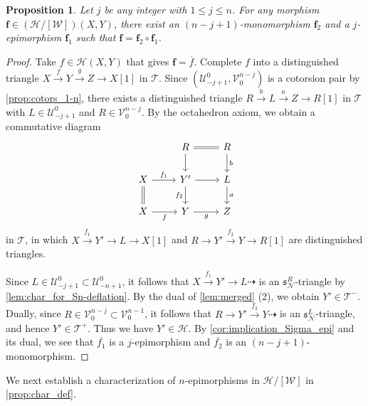 \documentclass[a4paper,reqno,10pt]{amsart}
\DeclareRobustCommand{\darkblueedit}[1]{#1}
\newtheorem{proposition}[proposition]{Proposition}
\theoremstyle{definition}
\theoremstyle{definition}
\theoremstyle{definition}
\theoremstyle{definition}
\theoremstyle{plain}
\newcommand{\fs}{\mathfrak{s}}
\newcommand{\CH}{\mathcal{H}}
\newcommand{\CN}{\mathcal{N}}
\newcommand{\CT}{\mathcal{T}}
\newcommand{\CU}{\mathcal{U}}
\newcommand{\CV}{\mathcal{V}}
\newcommand{\CW}{\mathcal{W}}
\begin{document}
\begin{proposition}\label{prop:factorization}
Let $j$ be any integer with $1\le j\le n$.
For any morphism $\mathbf{f}\in(\CH/[\CW])(X,Y)$, there exist an \darkblueedit{$(n-j+1)$-monomorphism} $\mathbf{f}_2$ and a $j$-epimorphism $\mathbf{f}_1$ such that $\mathbf{f}=\mathbf{f}_2\circ \mathbf{f}_1$.
\end{proposition}
\begin{proof}
Take $f\in\CH(X,Y)$ that gives $\mathbf{f}=\overline{f}$.
Complete $f$ into a distinguished triangle $X\xrightarrow{f}Y\xrightarrow{g}Z\to X[1]$ in $\CT$.
Since $(\CU_{-j+1}^0,\CV_0^{n-j})$ is a cotorsion pair by \cref{prop:cotors_1-n}, there exists a distinguished triangle
$R\xrightarrow{b}L\xrightarrow{a}Z\to R[1]$
in $\CT$ with $L\in\CU_{-j+1}^0$ and $R\in\CV_0^{n-j}$.
By the octahedron axiom, we obtain a commutative diagram
\[
\begin{tikzcd}
{} & R\arrow{d}\arrow[equal]{r} & R\arrow{d}{b} 
\\
X\arrow{r}{f_1}\arrow[equal]{d} & Y'\arrow{d}[swap]{f_2}\arrow{r} & L\arrow{d}{a}
\\
X\arrow{r}[swap]{f} & Y\arrow{r}[swap]{g} & Z %
\end{tikzcd}
\]
in $\CT$, in which $X\xrightarrow{f_1}Y'\to L\to X[1]$ and $R\to Y'\xrightarrow{f_2}Y\to R[1]$ are distinguished triangles.

Since $L\in\CU_{-j+1}^0\subset\CU_{-n+1}^0$, it follows that 
$X\xrightarrow{f_1}Y'\to L\dashrightarrow$ is an $\fs^R_{\CN}$-triangle by \cref{lem:char_for_Sn-deflation}.
By the dual of \cref{lem:merged} {\rm (2)}, we obtain $Y'\in\CT^-$. 
Dually, since $R\in\CV_0^{n-j}\subset\CV_0^{n-1}$, it follows that 
$R\to Y'\xrightarrow{f_2}Y\dashrightarrow$ is an $\fs^L_{\CN}$-triangle, and hence $Y'\in\CT^+$. 
Thus we have $Y'\in\CH$. By \cref{cor:implication_Sigma_epi} and its dual, we see that $\overline{f_1}$ is a $j$-epimorphism and $\overline{f_2}$ is an $(n-j+1)$-monomorphism.
\end{proof}
\normalcolor


We next establish a characterization of %
$n$-epimorphisms in $\CH/[\CW]$ in \cref{prop:char_def}.
\end{document}
